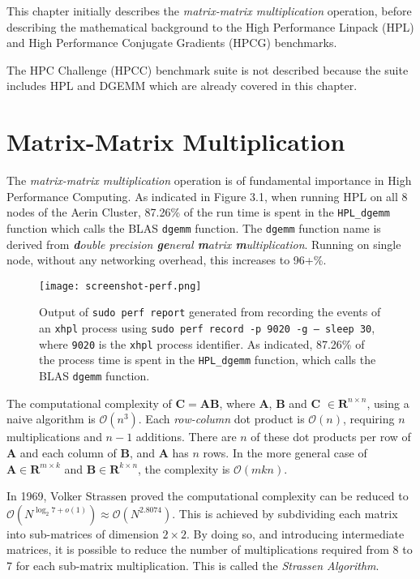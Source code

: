 This chapter initially describes the \emph{matrix-matrix multiplication} operation, before describing the mathematical background to the High Performance Linpack (HPL) and High Performance Conjugate Gradients (HPCG) benchmarks.

The HPC Challenge (HPCC) benchmark suite is not described because the suite includes HPL and DGEMM which are already covered in this chapter.


%
%
\section{Matrix-Matrix Multiplication}

The \emph{matrix-matrix multiplication} operation is of fundamental importance in High Performance Computing. As indicated in Figure 3.1, when running HPL on all 8 nodes of the Aerin Cluster, 87.26\% of the run time is spent in the \verb|HPL_dgemm| function which calls the BLAS \verb|dgemm| function. The \verb|dgemm| function name is derived from \emph{\textbf{d}ouble precision \textbf{ge}neral \textbf{m}atrix \textbf{m}ultiplication}. Running on single node, without any networking overhead, this increases to 96+\%.

\begin{figure}[h]
	\centering	
	\texttt{[image: screenshot-perf.png]}
	\caption{Output of \texttt{sudo perf report} generated from recording the events of an \texttt{xhpl} process using \texttt{sudo perf record -p 9020 -g -- sleep 30}, where \texttt{9020} is the \texttt{xhpl} process identifier. As indicated, 87.26\% of the process time is spent in the \texttt{HPL\_dgemm} function, which calls the BLAS \texttt{dgemm} function.}
\end{figure}

The computational complexity of $\mathbf{C} = \mathbf{AB}$, where $\mathbf{A}$, $\mathbf{B}$ and $\mathbf{C}$ $\in \mathbf{R}^{n \times n}$, using a naive algorithm is $\mathcal{O}(n^3)$. Each \emph{row-column} dot product is $\mathcal{O}(n)$, requiring $n$ multiplications and $n - 1$ additions. There are $n$ of these dot products per row of $\mathbf{A}$ and each column of $\mathbf{B}$, and $\mathbf{A}$ has $n$ rows. In the more general case of $\mathbf{A} \in \mathbf{R}^{m \times k}$ and $\mathbf{B} \in \mathbf{R}^{k \times n}$, the complexity is $\mathcal{O}(mkn).$ 

In 1969, Volker Strassen \cite{strassen} proved the computational complexity can be reduced to $\mathcal{O}(N^{\log _{2}7+o(1)})\approx \mathcal{O}(N^{2.8074})$. This is achieved by subdividing each matrix into sub-matrices of dimension $2 \times 2$. By doing so, and introducing intermediate matrices, it is possible to reduce the number of multiplications required from 8 to 7 for each sub-matrix multiplication. This is called the \emph{Strassen Algorithm}.

